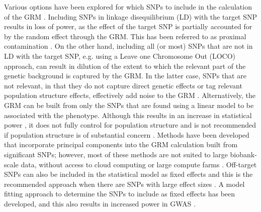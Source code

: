 \documentclass[doublespacing]{bmcart}
\begin{document}
Various options have been explored for which SNPs to include in the calculation of the GRM \cite{yang2014advantages}. Including SNPs in linkage disequilibrium (LD) with the target SNP results in loss of power, as the effect of the target SNP is partially accounted for by the random effect through the GRM. This has been referred to as proximal contamination \cite{listgarten2012improved}. On the other hand, including all (or most) SNPs that are not in LD with the target SNP, e.g. using a Leave one Chromosome Out (LOCO) approach, can result in dilution of the extent to which the relevant part of the genetic background is captured by the GRM. In the latter case, SNPs that are not relevant, in that they do not capture direct genetic effects or tag relevant population structure effects, effectively add noise to the GRM \cite{listgarten2012improved}. Alternatively, the GRM can be built from only the SNPs that are found using a linear model to be associated with the phenotype. Although this results in an increase in statistical power \cite{fastlmm,yang2014advantages,lippert2013benefits}, it does not fully control for population structure and is not recommended if population structure is of substantial concern \cite{BOLT,yang2014advantages}. Methods have been developed that incorporate principal components into the GRM calculation built from significant SNPs; however, most of these methods are not suited to large biobank-scale data, without access to cloud computing or large compute farms \cite{tucker2014improving,canela2018atlas}. Off-target SNPs can also be included in the statistical model as fixed effects and this is the recommended approach when there are SNPs with large effect sizes \cite{yang2014advantages}. A model fitting approach to determine the SNPs to include as fixed effects has been developed, and this also results in increased power in GWAS \cite{listgarten2012improved}.  

\par 
\end{document}
